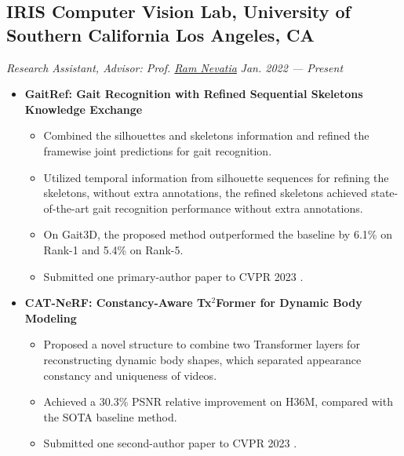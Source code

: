\documentclass[a4,10pt]{article}
\newcommand{\subtext}[1]{
#1\par\vspace{-0.2cm}}
\newenvironment{zitemize}{
\begin{itemize}\itemsep0pt \parskip0pt \parsep1pt}
{\end{itemize}\vspace{-0.5cm}}
\begin{document}
\subsection*{IRIS Computer Vision Lab, University of Southern California \hfill Los Angeles, CA}
\subtext{\textit{Research Assistant, Advisor: Prof. \href{https://sites.usc.edu/iris-cvlab/professor-ram-nevatia/} {Ram Nevatia} }\hfill \textit{Jan. 2022 --- Present}}
    \begin{zitemize}
        \item \textbf{GaitRef: Gait Recognition with Refined Sequential Skeletons
Knowledge Exchange}
            \begin{itemize}
                \item Combined the silhouettes and skeletons information and refined the framewise joint predictions for gait recognition.
                \item Utilized temporal information from silhouette sequences for refining the skeletons, without extra annotations, the refined skeletons achieved state-of-the-art gait recognition performance without extra annotations.
                \item On Gait3D, the proposed method outperformed the baseline by 6.1\% on Rank-1 and 5.4\% on Rank-5.
                \item Submitted one primary-author paper to CVPR 2023 \cite{Pap1}.
            \end{itemize}

        \item \textbf{CAT-NeRF: Constancy-Aware Tx$^2$Former for Dynamic Body Modeling}
            \begin{itemize}
                \item Proposed a novel structure to combine two Transformer layers for reconstructing dynamic body shapes, which separated appearance constancy and uniqueness of videos. 
                \item Achieved a 30.3\% PSNR relative improvement on H36M, compared with the SOTA baseline method.
                \item Submitted one second-author paper to CVPR 2023 \cite{Pap2}.
            \end{itemize}
        
        \end{zitemize}
\end{document}
